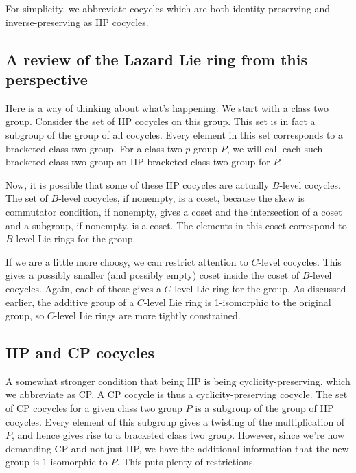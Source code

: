 \documentclass[10pt]{amsart}
\begin{document}
For simplicity, we abbreviate cocycles which are both
identity-preserving and inverse-preserving as IIP cocycles.

\subsection{A review of the Lazard Lie ring from this perspective}

Here is a way of thinking about what's happening. We start with a
class two group. Consider the set of IIP cocycles on this group. This
set is in fact a subgroup of the group of all cocycles. Every element
in this set corresponds to a bracketed class two group. For a class
two $p$-group $P$, we will call each such bracketed class two group an
IIP bracketed class two group for $P$.

Now, it is possible that some of these IIP cocycles are actually
$B$-level cocycles. The set of $B$-level cocycles, if nonempty, is a
coset, because the skew is commutator condition, if nonempty, gives a
coset and the intersection of a coset and a subgroup, if nonempty, is
a coset. The elements in this coset correspond to $B$-level Lie rings
for the group.

If we are a little more choosy, we can restrict attention to $C$-level
cocycles. This gives a possibly smaller (and possibly empty) coset
inside the coset of $B$-level cocycles. Again, each of these gives a
$C$-level Lie ring for the group. As discussed earlier, the additive
group of a $C$-level Lie ring is 1-isomorphic to the original group,
so $C$-level Lie rings are more tightly constrained.

\subsection{IIP and CP cocycles}

A somewhat stronger condition that being IIP is being
cyclicity-preserving, which we abbreviate as CP. A CP cocycle is thus
a cyclicity-preserving cocycle. The set of CP cocycles for a given
class two group $P$ is a subgroup of the group of IIP cocycles. Every
element of this subgroup gives a twisting of the multiplication of
$P$, and hence gives rise to a bracketed class two group. However,
since we're now demanding CP and not just IIP, we have the additional
information that the new group is 1-isomorphic to $P$. This puts
plenty of restrictions.
\end{document}
